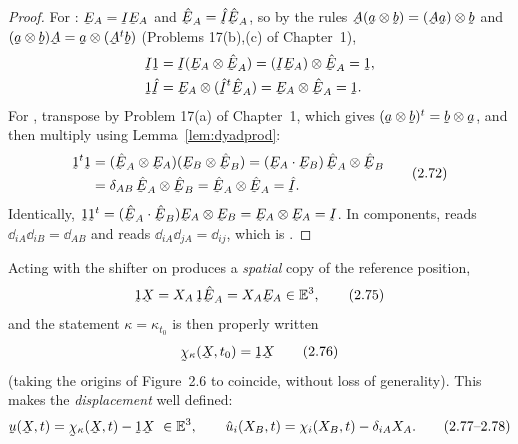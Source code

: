 \begin{proof}
For : $\bE_A=\I\bE_A$ and $\hbE_A=\hat\I\hbE_A$, so by the rules
$\bA(\ba\otimes\bb)=(\bA\ba)\otimes\bb$ and
$(\ba\otimes\bb)\bA=\ba\otimes(\bA^{t}\bb)$ (Problems 17(b),(c) of
Chapter~1),
\[
\begin{aligned}
   \I\vek{1}&=\I(\bE_A\otimes\hbE_A)=(\I\bE_A)\otimes\hbE_A=\vek{1},\\
   \vek{1}\hat\I&=\bE_A\otimes(\hat\I^{t}\hbE_A)=\bE_A\otimes\hbE_A=\vek{1}.
\end{aligned}
\]
For , transpose  by Problem 17(a) of Chapter~1, which gives
$(\ba\otimes\bb)^{t}=\bb\otimes\ba$, and then multiply using
Lemma~\ref{lem:dyadprod}:
\begin{equation}
\begin{aligned}
   \vek{1}^{t}\vek{1}&=(\hbE_A\otimes\bE_A)(\bE_B\otimes\hbE_B)
   =(\ip{\bE_A}{\bE_B})\,\hbE_A\otimes\hbE_B\\
   &=\dd_{AB}\,\hbE_A\otimes\hbE_B=\hbE_A\otimes\hbE_A=\hat\I .
\end{aligned}\tag{2.72}
\end{equation}
Identically, $\vek{1}\vek{1}^{t}=(\ip{\hbE_A}{\hbE_B})\bE_A\otimes\bE_B
=\bE_A\otimes\bE_A=\I$. In components,  reads
$\dd_{iA}\dd_{iB}=\dd_{AB}$ and  reads $\dd_{iA}\dd_{jA}=\dd_{ij}$,
which is .
\end{proof}

Acting with the shifter on  produces a \emph{spatial} copy of the
reference position,
\begin{equation}
   \vek{1}\bX=X_A\,\vek{1}\hbE_A=X_A\bE_A\in\Vt, \tag{2.75}\label{eq:2.75}
\end{equation}
and the statement $\kappa=\kappa_{t_0}$ is then properly written
\begin{equation}
   \bchi_\kappa(\bX,t_0)=\vek{1}\bX \tag{2.76}\label{eq:2.76}
\end{equation}
(taking the origins of Figure~2.6 to coincide, without loss of generality).
This makes the \emph{displacement} well defined:
\begin{equation}
   \bu(\bX,t)=\bchi_\kappa(\bX,t)-\vek{1}\bX\ \in\Vt,\qquad
   \hat u_i(X_B,t)=\chi_i(X_B,t)-\dd_{iA}X_A. \tag{2.77--2.78}\label{eq:2.77}
\end{equation}

